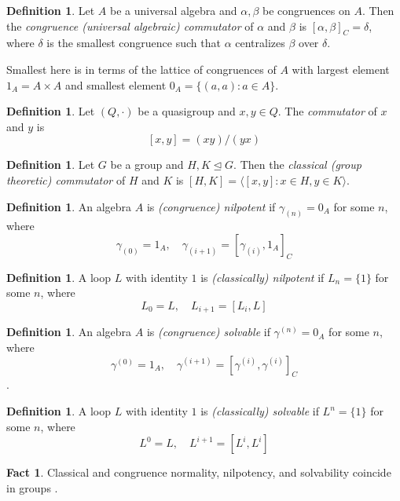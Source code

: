 \documentclass[12pt]{report}
\theoremstyle{definition}
\newtheorem{fct}[thm]{Fact}
\newtheorem{dfn}[thm]{Definition}
\newcommand{\rdv}{/}                %
\begin{document}
\begin{dfn}
  Let $A$ be a universal algebra and $\alpha, \beta$ be congruences on $A$. Then the
    \emph{congruence (universal algebraic) commutator} of $\alpha$ and $\beta$ is
    $[\alpha, \beta]_C = \delta$, where $\delta$ is the smallest congruence such that
    $\alpha$ centralizes $\beta$ over $\delta$. 

  Smallest here is in terms of the lattice of congruences of $A$ with largest element
    $1_A = A\times A$ and smallest element $0_A = \{(a, a) : a\in A\}$.
\end{dfn}

\begin{dfn}
  Let $(Q, \cdot)$ be a quasigroup and $x, y\in Q$. The \emph{commutator} of $x$ and $y$ is
  \[[x, y] = (xy)\rdv (yx)\]
\end{dfn}

\begin{dfn}
  Let $G$ be a group and $H, K\unlhd G$. Then the \emph{classical (group theoretic) commutator}
    of $H$ and $K$ is $[H, K] = \langle [x, y] : x\in H, y\in K\rangle$.
\end{dfn}

\begin{dfn}
  An algebra $A$ is \emph{(congruence) nilpotent} if $\gamma_{(n)} = 0_A$ for some $n$, where
  \[\gamma_{(0)} = 1_A,\quad \gamma_{(i + 1)} = [\gamma_{(i)}, 1_A]_C\]
\end{dfn}

\begin{dfn}
  A loop $L$ with identity $1$ is \emph{(classically) nilpotent} if $L_n = \{1\}$ for some $n$, where
  \[L_0 = L,\quad L_{i + 1} = [L_i, L]\]
\end{dfn}

\begin{dfn}
  An algebra $A$ is \emph{(congruence) solvable} if $\gamma^{(n)} = 0_A$ for some $n$, where
  \[\gamma^{(0)} = 1_A,\quad \gamma^{(i + 1)} = [\gamma^{(i)}, \gamma^{(i)}]_C\].
\end{dfn}

\begin{dfn}
  A loop $L$ with identity $1$ is \emph{(classically) solvable} if $L^n = \{1\}$ for some $n$, where
  \[L^0 = L,\quad L^{i + 1} = [L^i, L^i]\]
\end{dfn}

\begin{fct}
  Classical and congruence normality, nilpotency, and solvability coincide in groups \cite{ComTheory}.
\end{fct}
\end{document}
